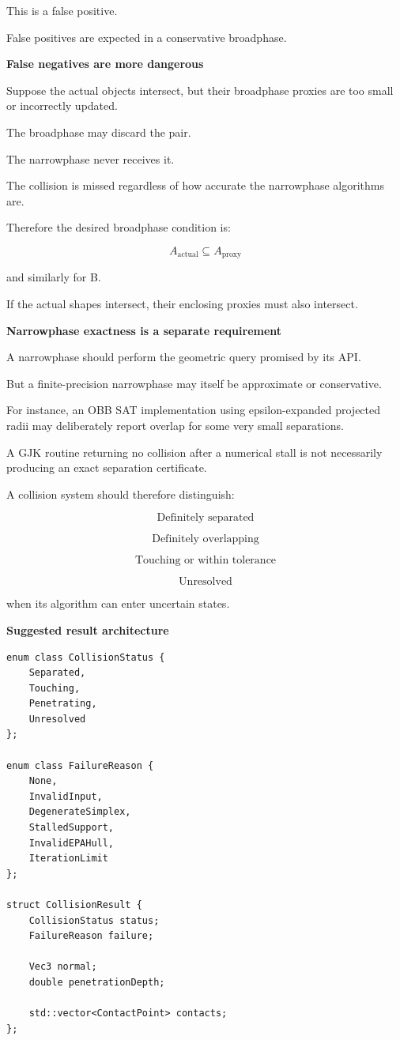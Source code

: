 This is a false positive.

False positives are expected in a conservative broadphase.

\textbf{False negatives are more dangerous}

Suppose the actual objects intersect, but their broadphase proxies are too small or incorrectly updated.

The broadphase may discard the pair.

The narrowphase never receives it.

The collision is missed regardless of how accurate the narrowphase algorithms are.

Therefore the desired broadphase condition is:

\[
\boxed{ A_{\mathrm{actual}}\subseteq A_{\mathrm{proxy}} }
\]

and similarly for B.

If the actual shapes intersect, their enclosing proxies must also intersect.

\textbf{Narrowphase exactness is a separate requirement}

A narrowphase should perform the geometric query promised by its API.

But a finite-precision narrowphase may itself be approximate or conservative.

For instance, an OBB SAT implementation using epsilon-expanded projected radii may deliberately report overlap for some very small separations.

A GJK routine returning no collision after a numerical stall is not necessarily producing an exact separation certificate.

A collision system should therefore distinguish:

\[
\text{Definitely separated}
\]

\[
\text{Definitely overlapping}
\]

\[
\text{Touching or within tolerance}
\]

\[
\text{Unresolved}
\]

when its algorithm can enter uncertain states.

\textbf{Suggested result architecture}

\begin{verbatim}
enum class CollisionStatus {
    Separated,
    Touching,
    Penetrating,
    Unresolved
};

enum class FailureReason {
    None,
    InvalidInput,
    DegenerateSimplex,
    StalledSupport,
    InvalidEPAHull,
    IterationLimit
};

struct CollisionResult {
    CollisionStatus status;
    FailureReason failure;

    Vec3 normal;
    double penetrationDepth;

    std::vector<ContactPoint> contacts;
};
\end{verbatim}

